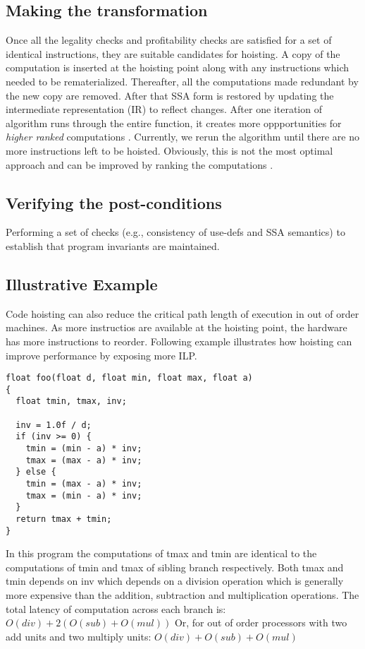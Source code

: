 \documentclass{sig-alternate}
\begin{document}
\subsection{Making the transformation}
Once all the legality checks and profitability checks are satisfied for a set of
identical instructions, they are suitable candidates for hoisting. A copy of the
computation is inserted at the hoisting point along with any instructions which
needed to be rematerialized. Thereafter, all the computations made redundant by
the new copy are removed. After that SSA form is restored by updating the
intermediate representation (IR) to reflect changes. After one iteration of
algorithm runs through the entire function, it creates more oppportunities for
\emph{higher ranked} computations \cite{rosen1988global}. Currently, we rerun
the algorithm until there are no more instructions left to be
hoisted. Obviously, this is not the most optimal approach and can be improved by
ranking the computations \cite{rosen1988global}.

\subsection{Verifying the post-conditions}
Performing a set of checks (e.g., consistency of use-defs and SSA semantics) to
establish that program invariants are maintained.


\subsection{Illustrative Example}
Code hoisting can also reduce the critical path length of execution in out of
order machines. As more instructios are available at the hoisting point, the
hardware has more instructions to reorder. Following example illustrates how
hoisting can improve performance by exposing more ILP.

\begin{verbatim}
float foo(float d, float min, float max, float a)
{
  float tmin, tmax, inv;

  inv = 1.0f / d;
  if (inv >= 0) {
    tmin = (min - a) * inv;
    tmax = (max - a) * inv;
  } else {
    tmin = (max - a) * inv;
    tmax = (min - a) * inv;
  }
  return tmax + tmin;
}
\end{verbatim}

In this program the computations of tmax and tmin are identical to the
computations of tmin and tmax of sibling branch respectively. Both tmax and tmin
depends on inv which depends on a division operation which is generally more
expensive than the addition, subtraction and multiplication operations. The
total latency of computation across each branch is:
$O(div) + 2(O(sub) + O(mul))$
Or, for out of order processors with two add units and two multiply units:
$O(div) + O(sub) + O(mul)$
\end{document}

